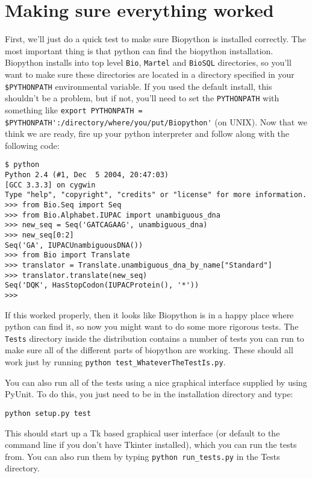 \documentclass{article}
\begin{document}
\section{Making sure everything worked}
\label{sec:is_working}

First, we'll just do a quick test to make sure Biopython is installed correctly. The most important thing is that python can find the biopython installation. Biopython installs into top level \verb|Bio|, \verb|Martel| and \verb|BioSQL| directories, so you'll want to make sure these directories are located in a directory specified 
in your\verb| $PYTHONPATH| environmental variable. If you used the default install, this shouldn't be a problem, but if not, you'll need to set the \verb|PYTHONPATH| with something like \verb|export PYTHONPATH = $PYTHONPATH':/directory/where/you/put/Biopython'| (on UNIX). Now that we think we are ready, fire up your python interpreter and follow along with the following code:

\begin{verbatim}
$ python
Python 2.4 (#1, Dec  5 2004, 20:47:03)
[GCC 3.3.3] on cygwin
Type "help", "copyright", "credits" or "license" for more information.
>>> from Bio.Seq import Seq
>>> from Bio.Alphabet.IUPAC import unambiguous_dna
>>> new_seq = Seq('GATCAGAAG', unambiguous_dna)
>>> new_seq[0:2]
Seq('GA', IUPACUnambiguousDNA())
>>> from Bio import Translate
>>> translator = Translate.unambiguous_dna_by_name["Standard"]
>>> translator.translate(new_seq)
Seq('DQK', HasStopCodon(IUPACProtein(), '*'))
>>>
\end{verbatim}

If this worked properly, then it looks like Biopython is in a happy place where python can find it, so now you might want to do some more rigorous tests. The \verb|Tests| directory inside the distribution contains a number of tests you can run to make sure all of the different parts of biopython are working. These should all work just by running \verb|python test_WhateverTheTestIs.py|. 


You can also run all of the tests using a nice graphical interface supplied by using PyUnit. To do this, you just need to be in the installation directory and type:

\begin{verbatim}
python setup.py test
\end{verbatim}

This should start up a Tk based graphical user interface (or default to the command line if you don't have Tkinter installed), which you can run the tests from. You can also run them by typing \verb|python run_tests.py| in the Tests directory.
\end{document}
